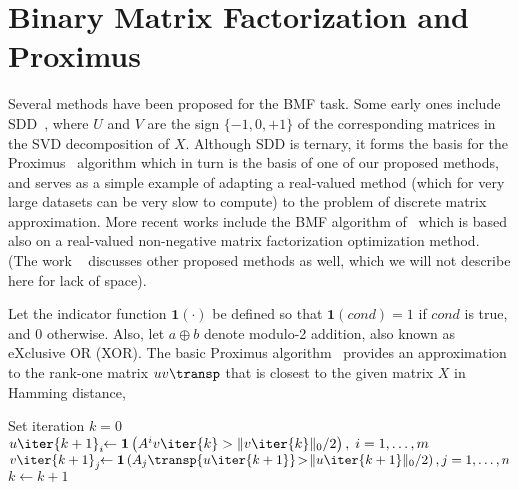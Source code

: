 \documentclass[a4paper]{IEEEtran}
\begin{document}
\section{Binary Matrix Factorization and Proximus}

Several methods have been proposed for the BMF task. Some early ones include SDD~\cite{sdd}, where $U$ and $V$ are the sign $\{-1,0,+1\}$ of the corresponding matrices in the SVD decomposition of $X$. Although SDD is ternary, it forms the basis for the Proximus~\cite{proximus} algorithm which in turn is the basis of one of our proposed methods, and serves as a simple example of adapting a real-valued method (which for very large datasets can be very slow to compute) to the problem of discrete matrix approximation.
More recent works include the BMF algorithm of~\cite{zhang07} which is based also on a real-valued non-negative matrix factorization optimization method.
(The work ~\cite{zhang07} discusses other proposed methods as well, which we will not describe here for lack of space). %

\def\indicator{\mathbf{1}}
Let the indicator function $\indicator(\cdot)$ be defined so that $\indicator(cond)=1$ if $cond$ is true, and $0$ otherwise. Also, let $a \oplus b$ denote modulo-2 addition, also known as eXclusive OR (XOR). The basic Proximus algorithm~\cite{proximus} provides an approximation to the rank-one matrix $uv\transp$ that is closest to the given matrix $X$ in Hamming distance,
\def\bool{\mathrm{bool}}
\begin{algorithm}
Set iteration $k=0$\;
 {
  $u\iter{k+1}_i\!\! \leftarrow \indicator \left( A^i v\iter{k} > \|v\iter{k}\|_0/2 \right),\;i=1,\ldots,m$ \;
  $v\iter{k+1}_j\!\! \leftarrow \indicator\left(A_j\transp{u\iter{k+1}}\!>\!\|u\iter{k+1}\|_0/2 \right),j=1,\ldots,n$ \;
  $k \leftarrow k+1 $ \;
}
\label{alg:proximus}
\end{algorithm}
\end{document}
